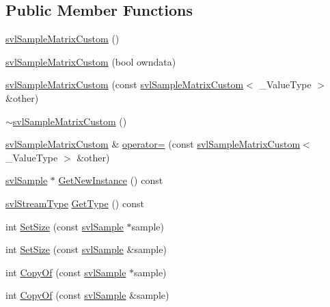 \subsection*{Public Member Functions}
\begin{DoxyCompactItemize}
\item 
\hyperlink{classsvl_sample_matrix_custom_af93fe127f9a2200a85a883cdd79c339f}{svl\-Sample\-Matrix\-Custom} ()
\item 
\hyperlink{classsvl_sample_matrix_custom_a6b25e2bf233d26c294a8db847daf15db}{svl\-Sample\-Matrix\-Custom} (bool owndata)
\item 
\hyperlink{classsvl_sample_matrix_custom_a5fb16bbf9f606264fcd656cb05b624c0}{svl\-Sample\-Matrix\-Custom} (const \hyperlink{classsvl_sample_matrix_custom}{svl\-Sample\-Matrix\-Custom}$<$ \-\_\-\-Value\-Type $>$ \&other)
\item 
\hyperlink{classsvl_sample_matrix_custom_ab858d8c35f72770d4b88c2ad8234ee77}{$\sim$svl\-Sample\-Matrix\-Custom} ()
\item 
\hyperlink{classsvl_sample_matrix_custom}{svl\-Sample\-Matrix\-Custom} \& \hyperlink{classsvl_sample_matrix_custom_a45d0275e76d8db8b7ae5f9e04fe53d3c}{operator=} (const \hyperlink{classsvl_sample_matrix_custom}{svl\-Sample\-Matrix\-Custom}$<$ \-\_\-\-Value\-Type $>$ \&other)
\item 
\hyperlink{classsvl_sample}{svl\-Sample} $\ast$ \hyperlink{classsvl_sample_matrix_custom_a361e11f0bb1ba61427667bad4c2c8353}{Get\-New\-Instance} () const 
\item 
\hyperlink{svl_definitions_8h_aa00696d338a58db361335a01fd11e122}{svl\-Stream\-Type} \hyperlink{classsvl_sample_matrix_custom_a211f4990d106d1bdf38156047a663c5d}{Get\-Type} () const 
\item 
int \hyperlink{classsvl_sample_matrix_custom_a479364ea9f6b50515d3628c54c40b182}{Set\-Size} (const \hyperlink{classsvl_sample}{svl\-Sample} $\ast$sample)
\item 
int \hyperlink{classsvl_sample_matrix_custom_a2529241b6e5e4d435f4f1dcee8e106b2}{Set\-Size} (const \hyperlink{classsvl_sample}{svl\-Sample} \&sample)
\item 
int \hyperlink{classsvl_sample_matrix_custom_ad76eee163ff3bc6d77b6a0d548ddd8c0}{Copy\-Of} (const \hyperlink{classsvl_sample}{svl\-Sample} $\ast$sample)
\item 
int \hyperlink{classsvl_sample_matrix_custom_abc85e5b6f11cd06e168716fc61847238}{Copy\-Of} (const \hyperlink{classsvl_sample}{svl\-Sample} \&sample)
\item 

\end{DoxyCompactItemize}

